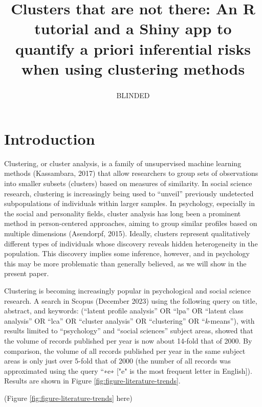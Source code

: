 \documentclass[
  man,floatsintext]{apa7}
\title{\textbf{Clusters that are not there: An R tutorial and a Shiny app to quantify a priori inferential risks when using clustering methods}}
\author{BLINDED\textsuperscript{}}
\date{}
\affiliation{\phantom{0}}
\begin{document}
\maketitle

\hypertarget{introduction}{%
\section{Introduction}\label{introduction}}

Clustering, or cluster analysis, is a family of unsupervised machine learning methods (Kassambara, 2017) that allow researchers to group sets of observations into smaller subsets (clusters) based on measures of similarity. In social science research, clustering is increasingly being used to ``unveil'' previously undetected subpopulations of individuals within larger samples. \color{red} In psychology, especially in the social and personality fields, cluster analysis has long been a prominent method in person-centered approaches, aiming to group similar profiles based on multiple dimensions (Asendorpf, 2015)\color{black}. Ideally, clusters represent qualitatively different types of individuals whose discovery reveals hidden heterogeneity in the population. This discovery implies some inference, however, and in psychology this may be more problematic than generally believed, as we will show in the present paper.

Clustering is becoming increasingly popular in psychological and social science research. A search in Scopus (December 2023) using the following query on title, abstract, and keywords: (``latent profile analysis'' OR ``lpa'' OR ``latent class analysis'' OR ``lca'' OR ``cluster analysis'' OR ``clustering'' OR ``\emph{k}-means''), with results limited to ``psychology'' and ``social sciences'' subject areas, showed that the volume of records published per year is now about 14-fold that of 2000. By comparison, the volume of all records published per year in the same subject areas is only just over 5-fold that of 2000 (the number of all records was approximated using the query ``∗e∗ \color{red}["e" is the most frequent letter in English]\color{black}). Results are shown in Figure \ref{fig:figure-literature-trends}.

(Figure \ref{fig:figure-literature-trends} here)
\end{document}
